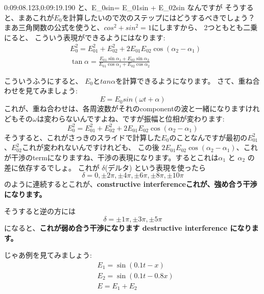 0:09:08.123,0:09:19.190
と、E_0sin\alpha =  E_01sin + E_02sin
なんですが
\fi
そうすると、まあこれが$E_0$を計算したいので次のステップにはどうするべきでしょう？まあ三角関数の公式を使うと、$cos^{2} + sin^{2} = 1$にしますから、
2つともとも二乗にると、
こういう表現ができるようにはなります:
\begin{equation}
\begin{aligned}
&E_{0}^{2}=E_{01}^{2}+E_{02}^{2}+2 E_{01} E_{02} \cos \left(\alpha_{2}-\alpha_{1}\right) \\
&\tan \alpha=\frac{E_{01} \sin \alpha_{1}+E_{02} \sin \alpha_{2}}{E_{01} \cos \alpha_{1}+E_{02} \cos \alpha_{2}}
\end{aligned}
\end{equation}

こういうふうにすると、 $E_0$と$tan\alpha$を計算できるようになります。
さて、重ね合わせを見てみましょう:
\begin{equation}
E = E_0 sin(\omega t + \alpha)
\end{equation}
これが、重ね合わせは、各周波数がそれのcomponentの波と一緒になりますけれどもその$\omega$は変わらないんですよね、ですが振幅と位相が変わります:
\begin{equation}
E_{0}^{2}=E_{01}^{2}+E_{02}^{2}+2 E_{01} E_{02} \cos \left(\alpha_{2}-\alpha_{1}\right)
\end{equation}
そうすると、これがさっきのスライドで計算した$E_0$のことなんですが最初の$E_{01}^{2}$、$E_{02}^{2}$これが変われないんですけれども、
この後 $2 E_{01} E_{02} \cos (\alpha_{2}-\alpha_{1})$、これが干渉のtermになりますね、干渉の表現になります。するとこれは$\alpha_1$ と $\alpha_2$ の差に依存するでしょ。
これが $\delta$(デルタ) という表現を使ったら
\begin{equation}
    \delta = 0, \pm2\pi, \pm4\pi, \pm6\pi, \pm8\pi, \pm10\pi
\end{equation}
のように連続するとこれが、\textbf{constructive interferenceこれが、強め合う干渉になります。}

そうすると逆の方には
\begin{equation}
    \delta = \pm1\pi, \pm3\pi, \pm5\pi
\end{equation}
 になると、\textbf{これが弱め合う干渉になります
destructive interference になります。}

じゃあ例を見てみましょう:
\begin{equation}
\begin{aligned}
&E_{1}=\sin (0.1 t-x) \\
&E_{2}=\sin (0.1 t-0.8 x) \\
&E=E_{1}+E_{2}
\end{aligned}
\end{equation}

